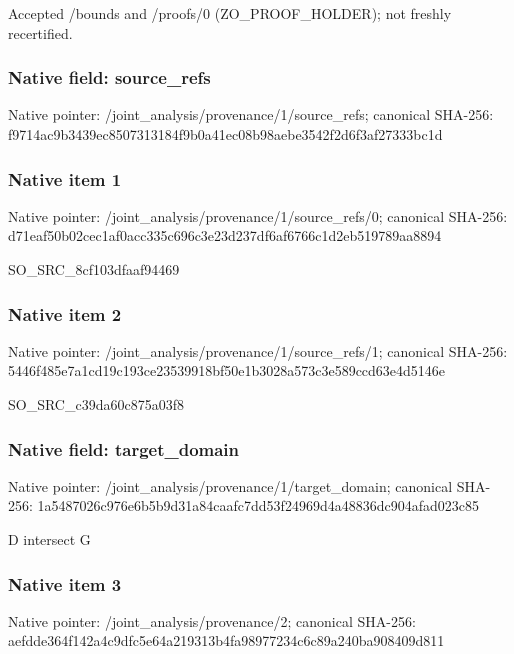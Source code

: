 \documentclass[10pt,a4paper]{article}
\begin{document}
\begingroup\raggedright\sloppy Accepted /\allowbreak{}bounds and /\allowbreak{}proofs/\allowbreak{}0 (ZO\_\allowbreak{}PROOF\_\allowbreak{}HOLDER);\allowbreak{} not freshly recertified.\par\endgroup

\subsubsection{Native field: source\_\allowbreak{}refs}
Native pointer: /joint\_\allowbreak{}analysis/provenance/1/source\_\allowbreak{}refs; canonical SHA-256: f9714ac9b3439ec8507313184f9b0a41ec08b98aebe3542f2d6f3af27333bc1d

\subsubsection{Native item 1}
Native pointer: /joint\_\allowbreak{}analysis/provenance/1/source\_\allowbreak{}refs/0; canonical SHA-256: d71eaf50b02cec1af0acc335c696c3e23d237df6af6766c1d2eb519789aa8894

\begingroup\raggedright\sloppy SO\_\allowbreak{}SRC\_\allowbreak{}8cf103dfaaf94469\par\endgroup

\subsubsection{Native item 2}
Native pointer: /joint\_\allowbreak{}analysis/provenance/1/source\_\allowbreak{}refs/1; canonical SHA-256: 5446f485e7a1cd19c193ce23539918bf50e1b3028a573c3e589ccd63e4d5146e

\begingroup\raggedright\sloppy SO\_\allowbreak{}SRC\_\allowbreak{}c39da60c875a03f8\par\endgroup

\subsubsection{Native field: target\_\allowbreak{}domain}
Native pointer: /joint\_\allowbreak{}analysis/provenance/1/target\_\allowbreak{}domain; canonical SHA-256: 1a5487026c976e6b5b9d31a84caafc7dd53f24969d4a48836dc904afad023c85

\begingroup\raggedright\sloppy D intersect G\par\endgroup

\subsubsection{Native item 3}
Native pointer: /joint\_\allowbreak{}analysis/provenance/2; canonical SHA-256: aefdde364f142a4c9dfc5e64a219313b4fa98977234c6c89a240ba908409d811
\end{document}
